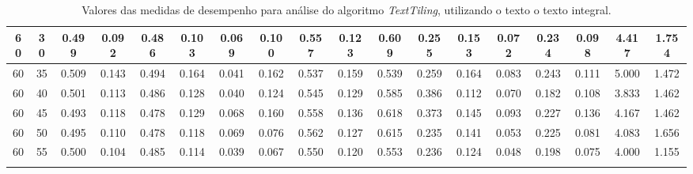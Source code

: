 \begin{longtable}[c]{|c|c|c|c|c|c|c|c|c|c|c|c|c|c|c|c|c|c|}
 60 & 30 & 0.499 & 0.092 & 0.486 & 0.103 & 0.069 & 0.100 & 0.557 & 0.123 & 0.609 & 0.255 & 0.153 & 0.072 & 0.234 & 0.098 & 4.417 & 1.754  \\ \hline 
 60 & 35 & 0.509 & 0.143 & 0.494 & 0.164 & 0.041 & 0.162 & 0.537 & 0.159 & 0.539 & 0.259 & 0.164 & 0.083 & 0.243 & 0.111 & 5.000 & 1.472  \\ \hline 
 60 & 40 & 0.501 & 0.113 & 0.486 & 0.128 & 0.040 & 0.124 & 0.545 & 0.129 & 0.585 & 0.386 & 0.112 & 0.070 & 0.182 & 0.108 & 3.833 & 1.462  \\ \hline 
 60 & 45 & 0.493 & 0.118 & 0.478 & 0.129 & 0.068 & 0.160 & 0.558 & 0.136 & 0.618 & 0.373 & 0.145 & 0.093 & 0.227 & 0.136 & 4.167 & 1.462  \\ \hline 
 60 & 50 & 0.495 & 0.110 & 0.478 & 0.118 & 0.069 & 0.076 & 0.562 & 0.127 & 0.615 & 0.235 & 0.141 & 0.053 & 0.225 & 0.081 & 4.083 & 1.656  \\ \hline 
 60 & 55 & 0.500 & 0.104 & 0.485 & 0.114 & 0.039 & 0.067 & 0.550 & 0.120 & 0.553 & 0.236 & 0.124 & 0.048 & 0.198 & 0.075 & 4.000 & 1.155  \\ \hline 
 \caption{Valores das medidas de desempenho para análise do algoritmo \textit{TextTiling}, utilizando o texto o texto integral.}
 \end{longtable} 



